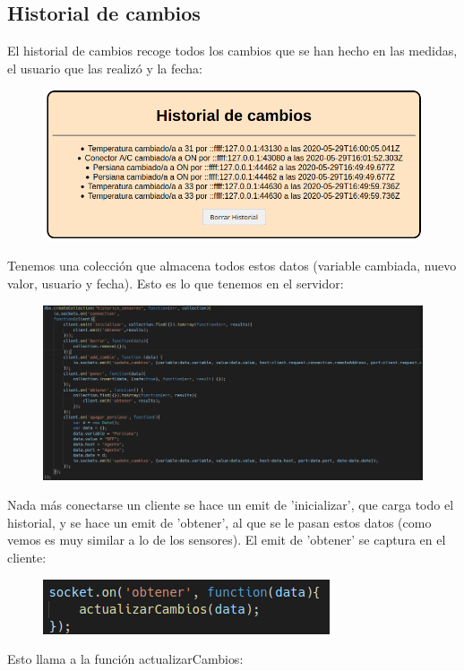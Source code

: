 \documentclass{article}
\begin{document}
	\subsection{Historial de cambios}
	El historial de cambios recoge todos los cambios que se han hecho en las medidas, el usuario que las realizó y la fecha:
	\begin{figure}[H]
		\centering
		\includegraphics[totalheight=5cm]{img/17.png}
	\end{figure}
	Tenemos una colección que almacena todos estos datos (variable cambiada, nuevo valor, usuario y fecha). Esto es lo que tenemos en el servidor:
	\begin{figure}[H]
		\centering
		\includegraphics[totalheight=6cm]{img/18.png}
	\end{figure}
	Nada más conectarse un cliente se hace un emit de 'inicializar', que carga todo el historial, y se hace un emit de 'obtener', al que se le pasan estos datos (como vemos es muy similar a lo de los sensores). El emit de 'obtener' se captura en el cliente:
	\begin{figure}[H]
		\centering
		\includegraphics[totalheight=1.6cm]{img/19.png}
	\end{figure}
	Esto llama a la función actualizarCambios:
\end{document}
